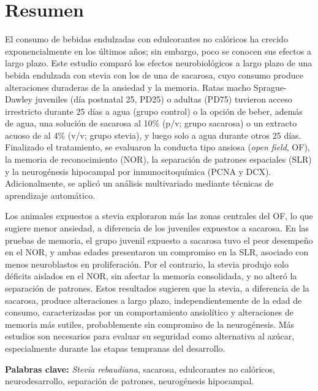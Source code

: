 \chapter*{Resumen}
{}

El consumo de bebidas endulzadas con edulcorantes no calóricos ha crecido exponencialmente en los últimos años; sin embargo, poco se conocen sus efectos a largo plazo. Este estudio comparó los efectos neurobiológicos a largo plazo de una bebida endulzada con stevia con los de una de sacarosa, cuyo consumo produce alteraciones duraderas de la ansiedad y la memoria. Ratas macho Sprague-Dawley juveniles (día postnatal 25, PD25) o adultas (PD75) tuvieron acceso irrestricto durante 25 días a agua (grupo control) o la opción de beber, además de agua, una solución de sacarosa al 10\% (p/v; grupo sacarosa) o un extracto acuoso de \stevia{} al 4\% (v/v; grupo stevia), y luego solo a agua durante otros 25 días. Finalizado el tratamiento, se evaluaron la conducta tipo ansiosa (\textit{open field}, OF), la memoria de reconocimiento (NOR), la separación de patrones espaciales (SLR) y la neurogénesis hipocampal por inmunocitoquímica (PCNA y DCX). Adicionalmente, se aplicó un análisis multivariado mediante técnicas de aprendizaje automático.

Los animales expuestos a stevia exploraron más las zonas centrales del OF, lo que sugiere menor ansiedad, a diferencia de los juveniles expuestos a sacarosa. En las pruebas de memoria, el grupo juvenil expuesto a sacarosa tuvo el peor desempeño en el NOR, y ambas edades presentaron un compromiso en la SLR, asociado con menos neuroblastos en proliferación. Por el contrario, la stevia produjo solo déficits aislados en el NOR, sin afectar la memoria consolidada, y no alteró la separación de patrones. Estos resultados sugieren que la stevia, a diferencia de la sacarosa, produce alteraciones a largo plazo, independientemente de la edad de consumo, caracterizadas por un comportamiento ansiolítico y alteraciones de memoria más sutiles, probablemente sin compromiso de la neurogénesis. Más estudios son necesarios para evaluar su seguridad como alternativa al azúcar, especialmente durante las etapas tempranas del desarrollo.

\vspace{1em}
\noindent\textbf{Palabras clave:} \textit{Stevia rebaudiana}, sacarosa, edulcorantes no calóricos, neurodesarrollo, separación de patrones, neurogénesis hipocampal.

